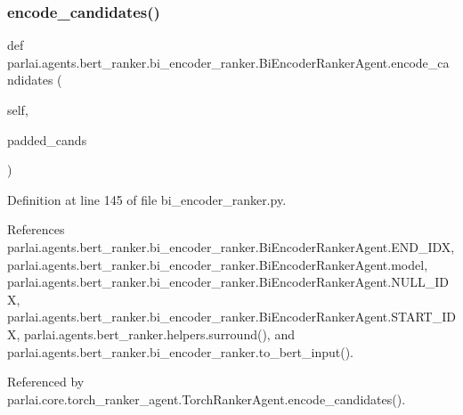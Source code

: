 \subsubsection{\texorpdfstring{encode\+\_\+candidates()}{encode\_candidates()}}
{\footnotesize\ttfamily def parlai.\+agents.\+bert\+\_\+ranker.\+bi\+\_\+encoder\+\_\+ranker.\+Bi\+Encoder\+Ranker\+Agent.\+encode\+\_\+candidates (\begin{DoxyParamCaption}\item[{}]{self,  }\item[{}]{padded\+\_\+cands }\end{DoxyParamCaption})}



Definition at line 145 of file bi\+\_\+encoder\+\_\+ranker.\+py.



References parlai.\+agents.\+bert\+\_\+ranker.\+bi\+\_\+encoder\+\_\+ranker.\+Bi\+Encoder\+Ranker\+Agent.\+E\+N\+D\+\_\+\+I\+DX, parlai.\+agents.\+bert\+\_\+ranker.\+bi\+\_\+encoder\+\_\+ranker.\+Bi\+Encoder\+Ranker\+Agent.\+model, parlai.\+agents.\+bert\+\_\+ranker.\+bi\+\_\+encoder\+\_\+ranker.\+Bi\+Encoder\+Ranker\+Agent.\+N\+U\+L\+L\+\_\+\+I\+DX, parlai.\+agents.\+bert\+\_\+ranker.\+bi\+\_\+encoder\+\_\+ranker.\+Bi\+Encoder\+Ranker\+Agent.\+S\+T\+A\+R\+T\+\_\+\+I\+DX, parlai.\+agents.\+bert\+\_\+ranker.\+helpers.\+surround(), and parlai.\+agents.\+bert\+\_\+ranker.\+bi\+\_\+encoder\+\_\+ranker.\+to\+\_\+bert\+\_\+input().



Referenced by parlai.\+core.\+torch\+\_\+ranker\+\_\+agent.\+Torch\+Ranker\+Agent.\+encode\+\_\+candidates().

